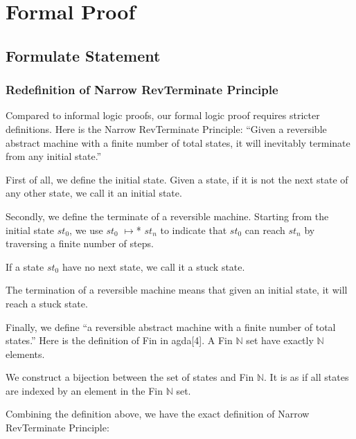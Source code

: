 \chapter{Formal Proof}
\label{chapter:ref}

\section{Formulate Statement}

\subsection{ Redefinition of Narrow RevTerminate Principle}
Compared to informal logic proofs, our formal logic proof requires stricter definitions. 
Here is the Narrow RevTerminate Principle:
``Given a reversible abstract machine with a finite number of total states, it will inevitably terminate from any initial state.''

First of all, we define the initial state.  Given a state, if it is not the next state of any other state, we call it an initial state.



Secondly, we define the terminate of a reversible machine.
Starting from the initial state $st_{0}$, we use $st_{0}$ $\mapsto$* $st_{n}$ to indicate that $st_{0}$ can reach $st_{n}$ by traversing a finite number of steps.



If a state $st_{0}$ have no next state, we call it a stuck state.



The termination of a reversible machine means that given an initial state, it will reach a stuck state.



Finally, we define ``a reversible abstract machine with a finite number of total states.''
Here is the definition of Fin in agda[4].  A Fin $\mathbb{N}$ set have exactly $\mathbb{N}$ elements.



We construct a bijection between the set of states and Fin $\mathbb{N}$.
It is as if all states are indexed by an element in the Fin $\mathbb{N}$ set.



Combining the definition above, we have the exact definition of Narrow RevTerminate Principle:


